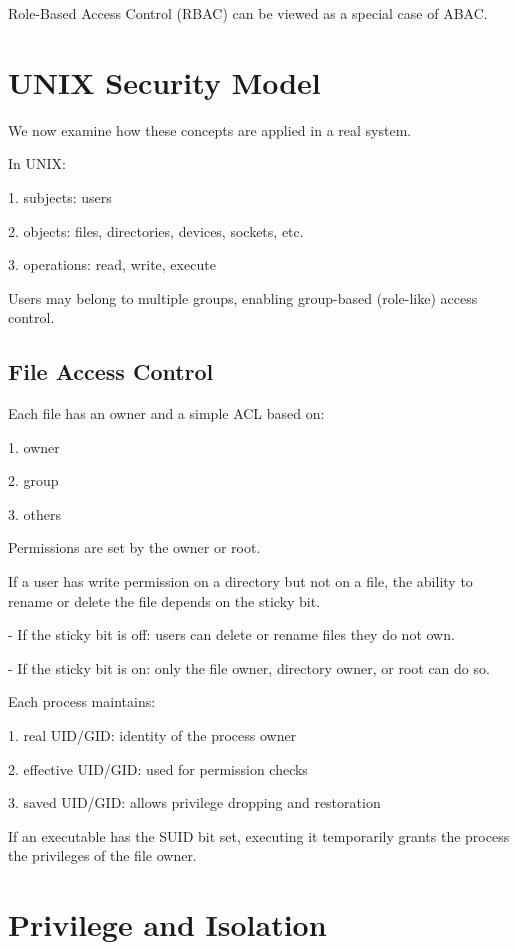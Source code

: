 Role-Based Access Control (RBAC) can be viewed as a special case of ABAC.

\section{UNIX Security Model}

We now examine how these concepts are applied in a real system.

In UNIX:

1. subjects: users

2. objects: files, directories, devices, sockets, etc.

3. operations: read, write, execute

Users may belong to multiple groups, enabling group-based (role-like) access control.

\subsection{File Access Control}
Each file has an owner and a simple ACL based on:

1. owner

2. group

3. others

Permissions are set by the owner or root.

\begin{remark}
  If a user has write permission on a directory but not on a file, the ability to rename or delete the file depends on the sticky bit.

  - If the sticky bit is off: users can delete or rename files they do not own.

  - If the sticky bit is on: only the file owner, directory owner, or root can do so.
\end{remark}

Each process maintains:

1. real UID/GID: identity of the process owner

2. effective UID/GID: used for permission checks

3. saved UID/GID: allows privilege dropping and restoration

If an executable has the SUID bit set, executing it temporarily grants the process the privileges of the file owner.

\section{Privilege and Isolation}

